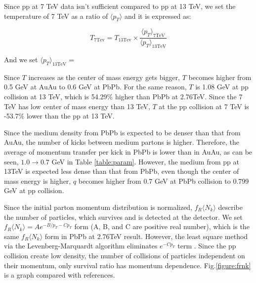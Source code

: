 \documentclass[jkps,fleqn,showpacs,showkeys]{revtex4}
\begin{document}
Since pp at 7 TeV data isn't sufficient compared to pp at 13 TeV, we set the temperature of 7 TeV as a ratio of $\langle p_T \rangle$ and it is expressed as:

\begin{equation} \label{equation:Tempratio}
T_{7 \text{Tev}} = T_{13 \text{Tev}} \times \frac{\langle p_T \rangle_{7 \text{TeV}}}{\langle p_T \rangle_{13 \text{TeV}}}
\end{equation}

And we set $\langle p_T \rangle _{13 \text{TeV}} = $

Since $T$ increases as the center of mass energy gets bigger, $T$ becomes higher from 0.5 GeV at AuAu to 0.6 GeV at PbPb. 
For the same reason, $T$ is 1.08 GeV at pp collision at 13 TeV, which is 54.29\% higher than PbPb at 2.76TeV.
Since the 7 TeV has low center of mass energy than 13 TeV, $T$ at the pp collision at 7 TeV is -53.7\% lower than the pp at 13 TeV.

Since the medium density from PbPb is expected to be denser than that from AuAu, the number of kicks between medium partons is higher.
Therefore, the average of momentum transfer per kick in PbPb is lower than in AuAu, as can be seen, $1.0 \rightarrow 0.7$ GeV in Table \ref{table:param}.
However, the medium from pp at 13TeV is expected less dense than that from PbPb, even though the center of mass energy is higher,
$q$ becomes higher from 0.7 GeV at PbPb collision to 0.799 GeV at pp collision. 

Since the initial parton momentum distribution is normalized, $f_R \langle N_k \rangle$ describe the number of particles, which survives and is detected at the detector. We set $f_R \langle N_k \rangle = Ae^{-{B} / {p_{T}} - Cp_T}$ form (A, B, and C are positive real number),
which is the same $f_R \langle N_k \rangle$ form in PbPb at 2.76TeV result\cite{PbPb}.
However, the least square method via the Levenberg-Marquardt algorithm eliminates $e^{-Cp_T}$ term .
Since the pp collision create low density, the number of collisions of particles independent on their momentum, only survival ratio has momentum dependence.
Fig.\ref{figure:frnk} is a graph compared with references\cite{Wong_1, PbPb, Hanul}.
\end{document}
